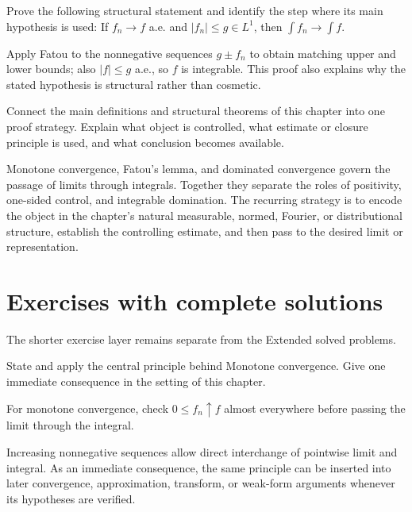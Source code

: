 \begin{problem}\label{prob:iii04-problem-11}
Prove the following structural statement and identify the step where its main hypothesis is used: If $f_n\to f$ a.e. and $|f_n|\le g\in L^1$, then $\int f_n\to\int f$.
\end{problem}
\begin{solution}
Apply Fatou to the nonnegative sequences $g\pm f_n$ to obtain matching upper and lower bounds; also $|f|\le g$ a.e., so $f$ is integrable. This proof also explains why the stated hypothesis is structural rather than cosmetic.
\end{solution}

\begin{problem}\label{prob:iii04-problem-12}
Connect the main definitions and structural theorems of this chapter into one proof strategy. Explain what object is controlled, what estimate or closure principle is used, and what conclusion becomes available.
\end{problem}
\begin{solution}
Monotone convergence, Fatou's lemma, and dominated convergence govern the passage of limits through integrals. Together they separate the roles of positivity, one-sided control, and integrable domination. The recurring strategy is to encode the object in the chapter's natural measurable, normed, Fourier, or distributional structure, establish the controlling estimate, and then pass to the desired limit or representation.
\end{solution}
\section{Exercises with complete solutions}
The shorter exercise layer remains separate from the Extended solved problems.

\begin{exercise}\label{exr:iii04-01}
State and apply the central principle behind Monotone convergence. Give one immediate consequence in the setting of this chapter.
\end{exercise}
\begin{hint}
For monotone convergence, check \(0\le f_n\uparrow f\) almost everywhere before passing the limit through the integral.
\end{hint}
\begin{solution}
Increasing nonnegative sequences allow direct interchange of pointwise limit and integral. As an immediate consequence, the same principle can be inserted into later convergence, approximation, transform, or weak-form arguments whenever its hypotheses are verified.
\end{solution}

